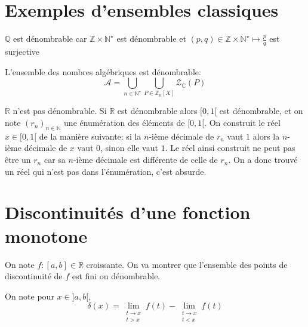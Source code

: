 \section{Exemples d'ensembles classiques}

\begin{ex}
    $\mathbb Q$ est dénombrable car $\mathbb Z\times \mathbb N^\star$ est dénombrable et $(p, q)\in\mathbb Z\times \mathbb N^\star\longmapsto \frac pq$ est surjective
\end{ex}

\begin{ex}
    L'ensemble des nombres algébriques est dénombrable: \[
        \mathcal A=\bigcup_{n\in\mathbb N^\star}\bigcup_{P\in\mathbb Z_n[X]}\mathcal Z_{\mathbb C}(P)
    \]
\end{ex}

\begin{ex}
    $\mathbb R$ n'est pas dénombrable. Si $\mathbb R$ est dénombrable alors $[0, 1[$ est dénombrable, et on note $(r_n)_{n\in\mathbb N}$ une énumération des éléments de $[0, 1[$. On construit le réel $x\in [0, 1[$ de la manière suivante: si la $n$-ième décimale de $r_n$ vaut $1$ alors la $n$-ième décimale de $x$ vaut $0$, sinon elle vaut $1$. Le réel ainsi construit ne peut pas être un $r_n$ car sa $n$-ième décimale est différente de celle de $r_n$. On a donc trouvé un réel qui n'est pas dans l'énumération, c'est absurde.
\end{ex}

\section{Discontinuités d'une fonction monotone}

On note $f:[a, b]\in\mathbb R$ croissante. On va montrer que l'ensemble des points de discontinuité de $f$ est fini ou dénombrable.

On note pour $x\in ]a, b[$, \[
    \delta(x)=\lim_{\substack{t\to x\\t>x}}f(t)-\lim_{\substack{t\to x\\t<x}}f(t)
\]

